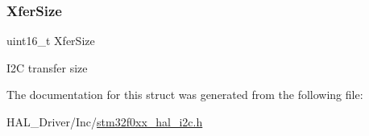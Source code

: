 \subsubsection{\texorpdfstring{Xfer\+Size}{XferSize}}
{\footnotesize\ttfamily uint16\+\_\+t Xfer\+Size}

I2C transfer size 

The documentation for this struct was generated from the following file\+:\begin{DoxyCompactItemize}
\item 
H\+A\+L\+\_\+\+Driver/\+Inc/\hyperlink{stm32f0xx__hal__i2c_8h}{stm32f0xx\+\_\+hal\+\_\+i2c.\+h}\end{DoxyCompactItemize}
